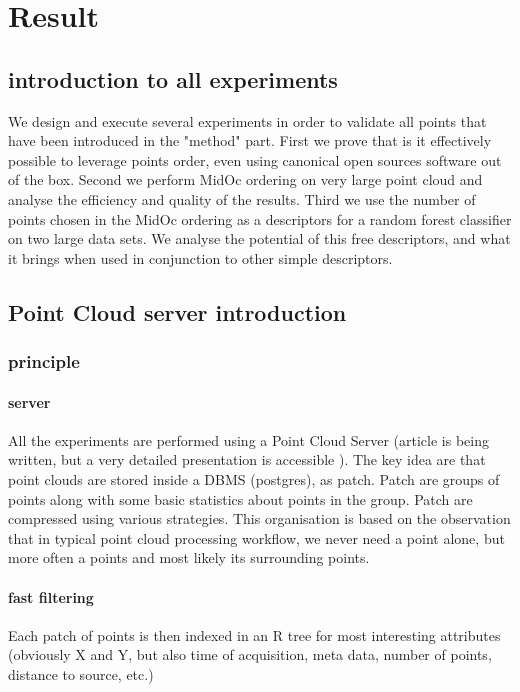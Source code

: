 

 \section{Result}
 	\subsection{introduction to all experiments}
 		We design and execute several experiments in order to validate all points that have been introduced in the "method" part.
 		First we prove that is it effectively possible to leverage points order, even using canonical open sources software out of the box.
 		Second we perform MidOc ordering on very large point cloud and analyse the efficiency and quality of the results.
 		Third we use the number of points chosen in the MidOc ordering as a descriptors for a random forest classifier on two large data sets.
 		We analyse the potential of this free descriptors, and what it brings when used in conjunction to other simple descriptors.
	\subsection{Point Cloud server introduction}
		\subsubsection{principle}
			\paragraph{server}
				All the experiments are performed using a Point Cloud Server (article is being written, but a very detailed presentation is accessible ).
				The key idea are that point clouds are stored inside a DBMS (postgres), as patch. Patch are groups of points along with some basic statistics about points in the group. Patch are compressed using various strategies.
				This organisation is based on the observation that in typical point cloud processing workflow, we never need a point alone, but more often a points and most likely its surrounding points.
			
			\paragraph{fast filtering}
				Each patch of points is then indexed in an R tree for most interesting attributes (obviously X and Y, but also time of acquisition, meta data, number of points, distance to source, etc.)
				
